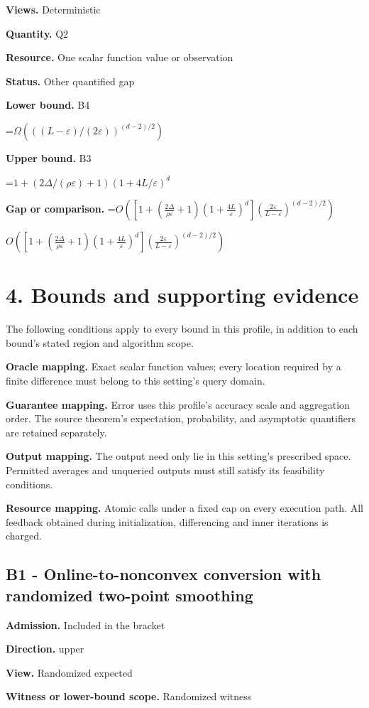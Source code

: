 \documentclass[10pt,a4paper]{article}
\newcommand{\AtlasMath}[1]{\par\begingroup\centering\setbox0=\hbox{$\displaystyle #1$}\ifdim\wd0>1.4\linewidth\typeout{ATLAS WIDE FORMULA: \the\wd0}\fi\ifdim\wd0>\linewidth\resizebox{\linewidth}{!}{\box0}\else\box0\fi\par\endgroup}
\newcommand{\AtlasInlineMath}[1]{\begingroup\setbox0=\hbox{$#1$}\ifdim\wd0>.4\linewidth\endgroup\AtlasMath{#1}\else\endgroup$#1$\fi}
\begin{document}
\textbf{Views.} Deterministic

\textbf{Quantity.} Q2

\textbf{Resource.} One scalar function value or observation

\textbf{Status.} Other quantified gap

\textbf{Lower bound.} B4

\AtlasMath{\Omega(((L-\varepsilon)/(2\varepsilon))^{(d-2)/2})}
\textbf{Upper bound.} B3

\AtlasMath{1+(2\Delta/(\rho\varepsilon)+1)(1+4L/\varepsilon)^d}
\textbf{Gap or comparison.} \AtlasInlineMath{O\!\left(\left[1+\left(\frac{2\Delta}{\rho\varepsilon}+1\right)\left(1+\frac{4L}{\varepsilon}\right)^d\right]\left(\frac{2\varepsilon}{L-\varepsilon}\right)^{(d-2)/2}\right)}

\section{4. Bounds and supporting evidence}
The following conditions apply to every bound in this profile, in addition to each bound's stated region and algorithm scope.

\textbf{Oracle mapping.} Exact scalar function values; every location required by a finite difference must belong to this setting's query domain.

\textbf{Guarantee mapping.} Error uses this profile's accuracy scale and aggregation order. The source theorem's expectation, probability, and asymptotic quantifiers are retained separately.

\textbf{Output mapping.} The output need only lie in this setting's prescribed space. Permitted averages and unqueried outputs must still satisfy its feasibility conditions.

\textbf{Resource mapping.} Atomic calls under a fixed cap on every execution path. All feedback obtained during initialization, differencing and inner iterations is charged.

\subsection{B1 - Online-to-nonconvex conversion with randomized two-point smoothing}
\textbf{Admission.} Included in the bracket

\textbf{Direction.} upper

\textbf{View.} Randomized expected

\textbf{Witness or lower-bound scope.} Randomized witness
\end{document}
